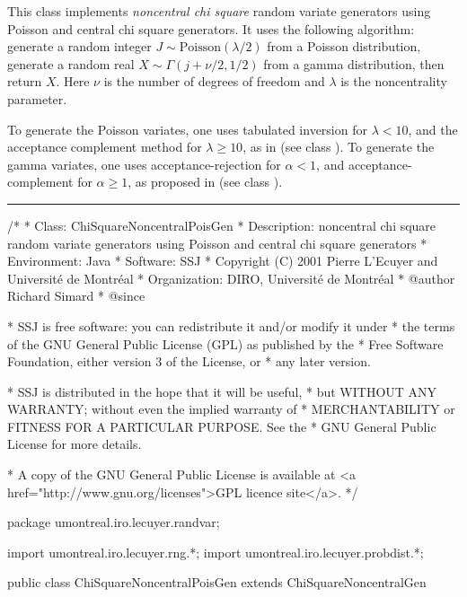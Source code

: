 
This class implements {\em noncentral chi square\/} random variate generators 
using Poisson and central chi square generators. It uses the following algorithm:
generate a random integer $J \sim \mbox{Poisson}(\lambda/2)$ from a Poisson 
distribution, generate a random real $X \sim \Gamma(j + \nu/2, 1/2)$ from a 
gamma distribution, then return $X$. 
Here $\nu$ is the number of degrees of freedom and 
$\lambda$ is the noncentrality parameter.

To generate the Poisson variates, one 
uses tabulated inversion for $\lambda<10$, and the acceptance complement 
method for $\lambda \ge 10$, as in \cite{rAHR82b}
(see class ).
To generate the gamma variates, one 
uses acceptance-rejection for $\alpha<1$, and acceptance-complement
for $\alpha\ge 1$, as proposed  in \cite{rAHR72b,rAHR82a}
(see class ).

\bigskip\hrule

\begin{code}
\begin{hide}
/*
 * Class:        ChiSquareNoncentralPoisGen
 * Description:  noncentral chi square random variate generators using Poisson
                 and central chi square generators
 * Environment:  Java
 * Software:     SSJ 
 * Copyright (C) 2001  Pierre L'Ecuyer and Université de Montréal
 * Organization: DIRO, Université de Montréal
 * @author       Richard Simard
 * @since

 * SSJ is free software: you can redistribute it and/or modify it under
 * the terms of the GNU General Public License (GPL) as published by the
 * Free Software Foundation, either version 3 of the License, or
 * any later version.

 * SSJ is distributed in the hope that it will be useful,
 * but WITHOUT ANY WARRANTY; without even the implied warranty of
 * MERCHANTABILITY or FITNESS FOR A PARTICULAR PURPOSE.  See the
 * GNU General Public License for more details.

 * A copy of the GNU General Public License is available at
   <a href="http://www.gnu.org/licenses">GPL licence site</a>.
 */
\end{hide}
package umontreal.iro.lecuyer.randvar;\begin{hide}
import umontreal.iro.lecuyer.rng.*;
import umontreal.iro.lecuyer.probdist.*;
\end{hide}

public class ChiSquareNoncentralPoisGen extends ChiSquareNoncentralGen \begin{hide} {
//   protected RandomStream aux; 

\end{hide}\end{code}


